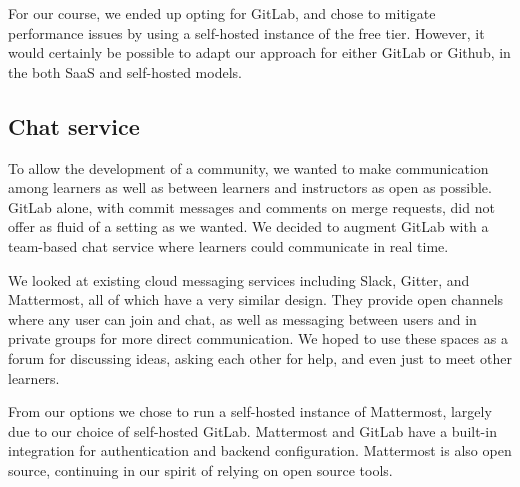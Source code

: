 \documentclass[12pt,twoside,vi]{mitthesis}
\begin{document}
For our course, we ended up opting for GitLab, and chose to mitigate performance issues by using a self-hosted instance of the free tier. However, it would certainly be possible to adapt our approach for either GitLab or Github, in the both SaaS and self-hosted models.

\subsection{Chat service}

To allow the development of a community, we wanted to make communication among learners as well as between learners and instructors as open as possible. GitLab alone, with commit messages and comments on merge requests, did not offer as fluid of a setting as we wanted. We decided to augment GitLab with a team-based chat service where learners could communicate in real time.

We looked at existing cloud messaging services including Slack, Gitter, and Mattermost, all of which have a very similar design. They provide open channels where any user can join and chat, as well as messaging between users and in private groups for more direct communication. We hoped to use these spaces as a forum for discussing ideas, asking each other for help, and even just to meet other learners.

From our options we chose to run a self-hosted instance of Mattermost, largely due to our choice of self-hosted GitLab. Mattermost and GitLab have a built-in integration for authentication and backend configuration. Mattermost is also open source, continuing in our spirit of relying on open source tools.
\end{document}
